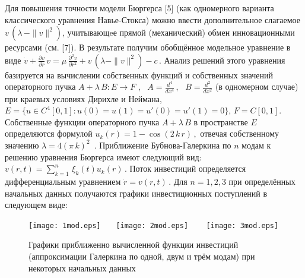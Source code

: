Для повышения точности модели Бюргерса [5] (как одномерного варианта
классического уравнения Навье-Сток\-са) можно ввести дополнительное
слагаемое $v\,\left(\lambda\, - \|v\|^2\right)$, учитывающeе прямой
(механический) обмен инновационными ресурсами (см. [7]). В
результате получим обобщённое модельное уравнение в виде
 $
\dot{v} + \frac{\partial v}{\partial r}\,v = \mu \, \frac{\partial^2
v}{\partial r^2} + v\,\left(\lambda - \|v\|^2\right) - c \,.
 $
Анализ решений этого уравнения  базируется на вычислении собственных
функций и собственных значений операторного пучка  $A + \lambda\,B :
E \to F$ , \ $A = \frac{d^4}{dx^4}$\,, \ $B = \frac{d^2}{dx^2}$ (в
одномерном случае) при краевых условиях Дирихле и Неймана,\  $E = \{u
\in C^4 [0,1]: u(0)=u(1)=u'(0)=u'(1) = 0 \}$, $ F = C[0,1]$.
Собственные функции операторного пучка $A +\lambda\,B$ в
пространстве $E$ определяются формулой
 $
u_k(r)=1-\cos(2\,k\,r)\,,
 $
отвечая собственному значению $\lambda=4(\pi\,k)^2\,$ . Приближение
Бубнова-Галеркина по $n$ модам к решению уравнения Бюргерса имеют
следующий вид:
 $
v(r,t) = \sum\limits_{k=1}^n\,\xi_k(t)u_k(r)\,.
 $
Поток инвестиций определяется дифференциальным уравнением
 $
\dot r=v(r,t)\,.
 $
Для $n=1,2,3$ при определённых начальных данных получаются графики
инвестиционных поступлений в следующем виде:

\begin{figure}[h!t]
	\centering
	\texttt{[image: 1mod.eps]} \ \ \
	\texttt{[image: 2mod.eps]} \ \ \
	\linebreak
	\linebreak
	\texttt{[image: 3mod.eps]}
	\caption{
		Графики приближенно вычисленной функции
		инвестиций (аппроксимации Галеркина по одной, двум и трём модам) при
		некоторых начальных данных
	}
\end{figure}



